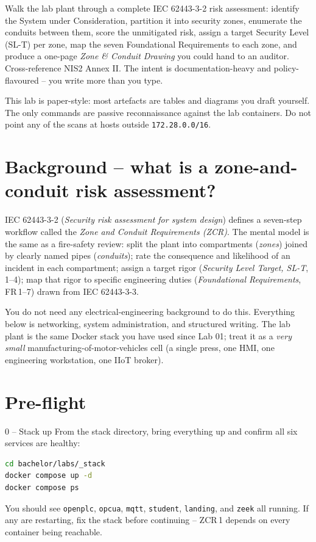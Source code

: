 \documentclass[11pt,a4paper]{article}
\begin{document}
\labheader

\begin{goalbox}
Walk the lab plant through a complete IEC 62443-3-2 risk assessment: identify the System under Consideration, partition it into security zones, enumerate the conduits between them, score the unmitigated risk, assign a target Security Level (SL-T) per zone, map the seven Foundational Requirements to each zone, and produce a one-page \emph{Zone \& Conduit Drawing} you could hand to an auditor. Cross-reference NIS2 Annex II. The intent is documentation-heavy and policy-flavoured -- you write more than you type.
\end{goalbox}

\begin{warnbox}
This lab is paper-style: most artefacts are tables and diagrams you draft yourself. The only commands are passive reconnaissance against the lab containers. Do not point any of the scans at hosts outside \texttt{172.28.0.0/16}.
\end{warnbox}

\section*{Background -- what is a zone-and-conduit risk assessment?}

IEC 62443-3-2 (\emph{Security risk assessment for system design}) defines a seven-step workflow called the \emph{Zone and Conduit Requirements (ZCR)}. The mental model is the same as a fire-safety review: split the plant into compartments (\emph{zones}) joined by clearly named pipes (\emph{conduits}); rate the consequence and likelihood of an incident in each compartment; assign a target rigor (\emph{Security Level Target, SL-T}, 1--4); map that rigor to specific engineering duties (\emph{Foundational Requirements}, FR\,1--7) drawn from IEC 62443-3-3.

You do not need any electrical-engineering background to do this. Everything below is networking, system administration, and structured writing. The lab plant is the same Docker stack you have used since Lab 01; treat it as a \emph{very small} manufacturing-of-motor-vehicles cell (a single press, one HMI, one engineering workstation, one IIoT broker).

\section*{Pre-flight}

\begin{stepbox}{0 -- Stack up}
From the stack directory, bring everything up and confirm all six services are healthy:
\begin{lstlisting}[language=bash]
cd bachelor/labs/_stack
docker compose up -d
docker compose ps
\end{lstlisting}
You should see \texttt{openplc}, \texttt{opcua}, \texttt{mqtt}, \texttt{student}, \texttt{landing}, and \texttt{zeek} all running. If any are restarting, fix the stack before continuing -- ZCR\,1 depends on every container being reachable.
\end{stepbox}
\end{document}
